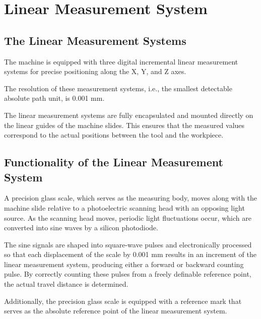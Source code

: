 
\section{Linear Measurement System}

\subsection*{The Linear Measurement Systems}
The machine is equipped with three digital incremental linear measurement systems for precise positioning along the X, Y, and Z axes.\footnotemark[1]

The resolution of these measurement systems, i.e., the smallest detectable absolute path unit, is 0.001 mm.

The linear measurement systems are fully encapsulated and mounted directly on the linear guides of the machine slides. This ensures that the measured values correspond to the actual positions between the tool and the workpiece.


\subsection*{Functionality of the Linear Measurement System}
A precision glass scale, which serves as the measuring body, moves along with the machine slide relative to a photoelectric scanning head with an opposing light source. As the scanning head moves, periodic light fluctuations occur, which are converted into sine waves by a silicon photodiode.

The sine signals are shaped into square-wave pulses and electronically processed so that each displacement of the scale by 0.001 mm results in an increment of the linear measurement system, producing either a forward or backward counting pulse. By correctly counting these pulses from a freely definable reference point, the actual travel distance is determined.

Additionally, the precision glass scale is equipped with a reference mark that serves as the absolute reference point of the linear measurement system.

